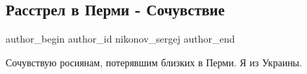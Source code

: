  
 
 
 
 
 
\subsection{Расстрел в Перми - Сочувствие}
\label{sec:20_09_2021.fb.nikonov_sergej.2.permj_sochuvstvie}
 
\ifcmt
 author_begin
   author_id nikonov_sergej
 author_end
\fi

Сочувствую росиянам, потерявшим близких в Перми. Я из Украины.
